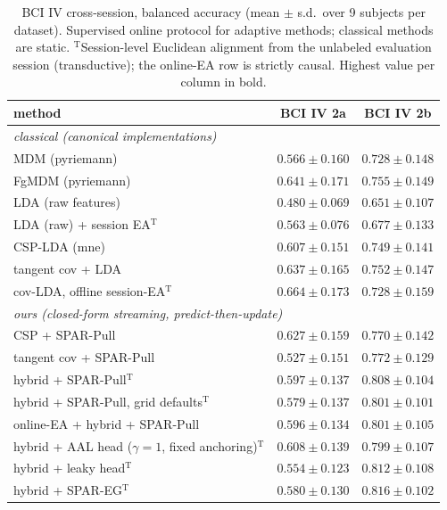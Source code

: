 \begin{table}[h]
\centering
\scriptsize
\setlength{\tabcolsep}{2.5pt}
\renewcommand{\arraystretch}{0.86}
\caption{BCI IV cross-session, balanced accuracy (mean $\pm$ s.d.\ over 9 subjects per dataset).
Supervised online protocol for adaptive methods; classical methods are static. $^{\mathrm{T}}$Session-level Euclidean alignment from the unlabeled evaluation session (transductive); the online-EA row is strictly causal.
Highest value per column in bold.}
\label{tab:eeg}
\begin{tabular}{lcc}
\toprule
method & BCI IV 2a & BCI IV 2b \\
\midrule
\multicolumn{3}{l}{\emph{classical (canonical implementations)}}\\
MDM (pyriemann) & $0.566 \pm 0.160$ & $0.728 \pm 0.148$ \\
FgMDM (pyriemann) & $0.641 \pm 0.171$ & $0.755 \pm 0.149$ \\
LDA (raw features) & $0.480 \pm 0.069$ & $0.651 \pm 0.107$ \\
LDA (raw) + session EA$^{\mathrm{T}}$ & $0.563 \pm 0.076$ & $0.677 \pm 0.133$ \\
CSP-LDA (mne) & $0.607 \pm 0.151$ & $0.749 \pm 0.141$ \\
tangent cov + LDA & $0.637 \pm 0.165$ & $0.752 \pm 0.147$ \\
cov-LDA, offline session-EA$^{\mathrm{T}}$ & $0.664 \pm 0.173$ & $0.728 \pm 0.159$ \\
\midrule
\multicolumn{3}{l}{\emph{ours (closed-form streaming, predict-then-update)}}\\
CSP + SPAR-Pull & $0.627 \pm 0.159$ & $0.770 \pm 0.142$ \\
tangent cov + SPAR-Pull & $0.527 \pm 0.151$ & $0.772 \pm 0.129$ \\
hybrid + SPAR-Pull$^{\mathrm{T}}$ & $0.597 \pm 0.137$ & $0.808 \pm 0.104$ \\
hybrid + SPAR-Pull, grid defaults$^{\mathrm{T}}$ & $0.579 \pm 0.137$ & $0.801 \pm 0.101$ \\
online-EA + hybrid + SPAR-Pull & $0.596 \pm 0.134$ & $0.801 \pm 0.105$ \\
hybrid + AAL head ($\gamma{=}1$, fixed anchoring)$^{\mathrm{T}}$ & $0.608 \pm 0.139$ & $0.799 \pm 0.107$ \\
hybrid + leaky head$^{\mathrm{T}}$ & $0.554 \pm 0.123$ & $0.812 \pm 0.108$ \\
hybrid + SPAR-EG$^{\mathrm{T}}$ & $0.580 \pm 0.130$ & $\mathbf{0.816 \pm 0.102}$ \\

\end{tabular}
\end{table}

